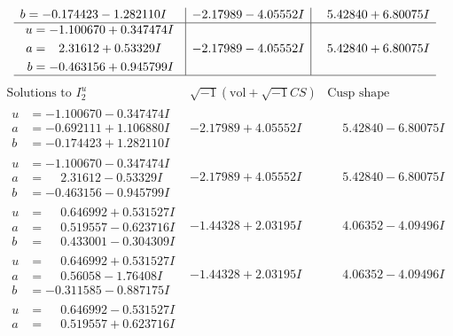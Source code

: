 \documentclass[1p]{elsarticle_modified}
\theoremstyle{definition}
\newcommand{\I}{\sqrt{-1}}
\begin{document}
$$\begin{array}{c|c|c}
\begin{aligned}
b &= -0.174423 - 1.282110 I\end{aligned}
 & -2.17989 - 4.05552 I & \phantom{-}5.42840 + 6.80075 I \\ \hline\begin{aligned}
u &= -1.100670 + 0.347474 I \\
a &= \phantom{-}2.31612 + 0.53329 I \\
b &= -0.463156 + 0.945799 I\end{aligned}
 & -2.17989 - 4.05552 I & \phantom{-}5.42840 + 6.80075 I\\
 \hline 
 \end{array}$$\newpage$$\begin{array}{c|c|c}  
\text{Solutions to }I^u_{2}& \I (\text{vol} + \sqrt{-1}CS) & \text{Cusp shape}\\
 \hline 
\begin{aligned}
u &= -1.100670 - 0.347474 I \\
a &= -0.692111 + 1.106880 I \\
b &= -0.174423 + 1.282110 I\end{aligned}
 & -2.17989 + 4.05552 I & \phantom{-}5.42840 - 6.80075 I \\ \hline\begin{aligned}
u &= -1.100670 - 0.347474 I \\
a &= \phantom{-}2.31612 - 0.53329 I \\
b &= -0.463156 - 0.945799 I\end{aligned}
 & -2.17989 + 4.05552 I & \phantom{-}5.42840 - 6.80075 I \\ \hline\begin{aligned}
u &= \phantom{-}0.646992 + 0.531527 I \\
a &= \phantom{-}0.519557 - 0.623716 I \\
b &= \phantom{-}0.433001 - 0.304309 I\end{aligned}
 & -1.44328 + 2.03195 I & \phantom{-}4.06352 - 4.09496 I \\ \hline\begin{aligned}
u &= \phantom{-}0.646992 + 0.531527 I \\
a &= \phantom{-}0.56058 - 1.76408 I \\
b &= -0.311585 - 0.887175 I\end{aligned}
 & -1.44328 + 2.03195 I & \phantom{-}4.06352 - 4.09496 I \\ \hline\begin{aligned}
u &= \phantom{-}0.646992 - 0.531527 I \\
a &= \phantom{-}0.519557 + 0.623716 I \\

\end{aligned}
\end{array}$$
\end{document}
